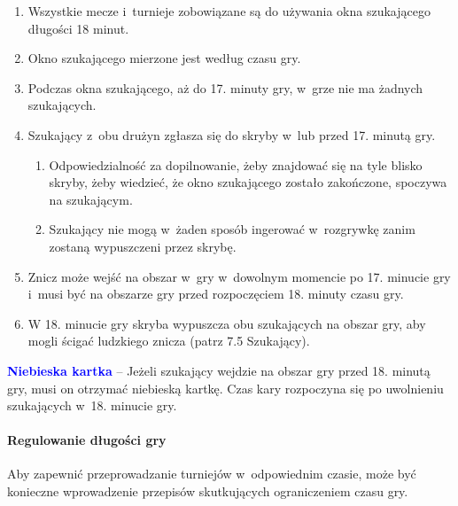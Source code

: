\documentclass[12pt,a4paper]{article}
\newcommand\bluecard[1]{\bgroup\textcolor{blue}{\textbf{#1}}}
\begin{document}
\begin{enumerate}
	\item Wszystkie mecze i~turnieje zobowiązane są do używania okna
	      szukającego długości 18 minut.

	\item Okno szukającego mierzone jest według czasu gry.

	\item Podczas okna szukającego, aż do 17. minuty gry, w~grze nie ma żadnych
	      szukających.

	\item Szukający z~obu drużyn zgłasza się do skryby w~lub przed 17. minutą
	      gry.
	      \begin{enumerate}
		      \item Odpowiedzialność za dopilnowanie, żeby znajdować się na tyle blisko
		            skryby, żeby wiedzieć, że okno szukającego zostało zakończone, spoczywa
		            na szukającym.

		      \item Szukający nie mogą w~żaden sposób ingerować w~rozgrywkę zanim
		            zostaną wypuszczeni przez skrybę.
	      \end{enumerate}

	\item Znicz może wejść na obszar w~gry w~dowolnym momencie po 17. minucie
	      gry i~musi być na obszarze gry przed rozpoczęciem 18. minuty czasu gry.

	\item W 18. minucie gry skryba wypuszcza obu szukających na obszar gry, aby
	      mogli ścigać ludzkiego znicza (patrz 7.5 Szukający).
\end{enumerate}

\bluecard{Niebieska kartka} -- Jeżeli szukający wejdzie na obszar gry przed
18. minutą gry, musi on otrzymać niebieską kartkę. Czas kary rozpoczyna
się po uwolnieniu szukających w~18. minucie gry.

\paragraph{Regulowanie długości gry}
Aby zapewnić
przeprowadzanie turniejów w~odpowiednim czasie, może być konieczne
wprowadzenie przepisów skutkujących ograniczeniem czasu gry.
\end{document}
